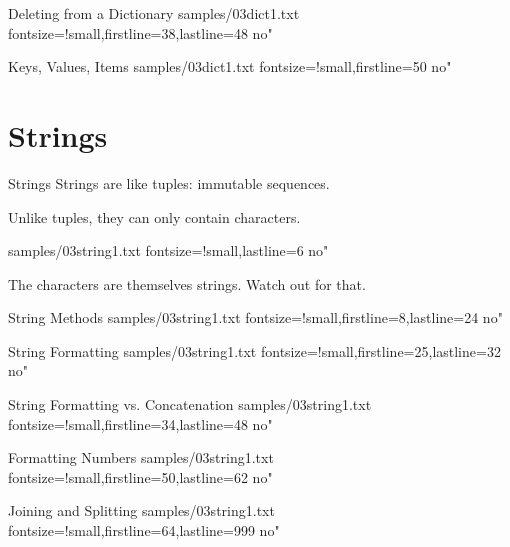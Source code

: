 \documentclass{pyslides}
\begin{document}
\begin{frame}[fragile]{Deleting from a Dictionary}
 samples/03dict1.txt fontsize=!small,firstline=38,lastline=48 no"
\end{frame}

\begin{frame}[fragile]{Keys, Values, Items}
 samples/03dict1.txt fontsize=!small,firstline=50 no"
\end{frame}


\section{Strings}

\begin{frame}[fragile]{Strings}
Strings are like tuples: immutable sequences.

Unlike tuples, they can only contain characters.

 samples/03string1.txt fontsize=!small,lastline=6 no"

\bigskip

The characters are themselves strings. Watch out for that.
\end{frame}

\begin{frame}[fragile]{String Methods}
 samples/03string1.txt fontsize=!small,firstline=8,lastline=24 no"
\end{frame}

\begin{frame}[fragile]{String Formatting}
 samples/03string1.txt fontsize=!small,firstline=25,lastline=32 no"
\end{frame}

\begin{frame}[fragile]{String Formatting vs. Concatenation}
 samples/03string1.txt fontsize=!small,firstline=34,lastline=48 no"
\end{frame}

\begin{frame}[fragile]{Formatting Numbers}
 samples/03string1.txt fontsize=!small,firstline=50,lastline=62 no"
\end{frame}

\begin{frame}[fragile]{Joining and Splitting}
 samples/03string1.txt fontsize=!small,firstline=64,lastline=999 no"
\end{frame}
\end{document}
